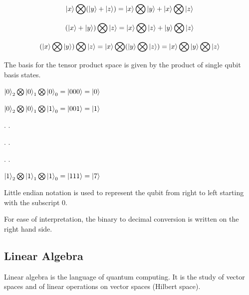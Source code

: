 \documentclass{article}
\begin{document}
\begin{equation}\ket{x} \bigotimes (\ket{y} + \ket{z}) = \ket{x}\bigotimes \ket{y} + \ket{x}\bigotimes\ket{z}
\end{equation}
\vspace{5mm}


\begin{equation}
(\ket{x} + \ket{y}) \bigotimes \ket{z} = \ket{x}\bigotimes \ket{z} + \ket{y}\bigotimes\ket{z}
\end{equation}
\vspace{5mm}


\begin{equation}
(\ket{x} \bigotimes \ket{y}) \bigotimes \ket{z} = \ket{x} \bigotimes (\ket{y} \bigotimes\ket{z}) = \ket{x} \bigotimes \ket{y} \bigotimes\ket{z}
\end{equation}
\vspace{10mm}

The basis for the tensor product space is given by the product of single qubit basis states.
\vspace{5mm}

\qquad $\ket{0}_2 \bigotimes \ket{0}_1 \bigotimes \ket{0}_0 = \ket{000} = \ket{0}$
\vspace{5mm}

\qquad $\ket{0}_2 \bigotimes \ket{0}_1 \bigotimes \ket{1}_0 = \ket{001} = \ket{1}$
\vspace{5mm}

\qquad \qquad \qquad . \qquad \qquad .

\qquad \qquad \qquad . \qquad \qquad .

\qquad \qquad \qquad . \qquad \qquad .

\qquad $\ket{1}_2 \bigotimes \ket{1}_1 \bigotimes \ket{1}_0 = \ket{111} = \ket{7}$
\vspace{5mm}

Little endian notation is used to represent the qubit from right to left starting with the subscript 0.

For ease of interpretation, the binary to decimal conversion is written on the right hand side. 
\vspace{10mm}

\subsection{Linear Algebra}
\vspace{5mm}

\noindent
Linear algebra is the language of quantum computing. It is the study of vector spaces and of linear operations on vector
spaces (Hilbert space).
\vspace{5mm}
\end{document}
